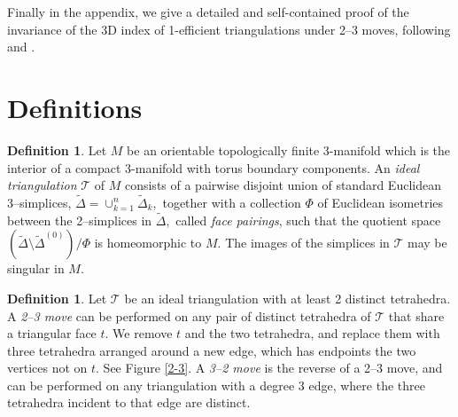 \documentclass[12pt]{amsart}
\theoremstyle{definition}
\newtheorem{defn}[thm]{Definition}
\theoremstyle{remark}
\def\tri{\mathcal{T}}
\newcommand{\CT}{\mathcal{T}}
\begin{document}
Finally in the appendix, we give a detailed and self-contained proof 
of the invariance of the 3D index of 1-efficient triangulations
under 2--3 moves, following \cite{Ga:index} and \cite{DGG2}. 


\section{Definitions}
\label{sec.definitions}

\begin{defn}
Let $M$ be an orientable topologically finite 3-manifold which is the interior of a compact 3-manifold with torus boundary components. An \emph{ideal triangulation} $\tri$ of $M$ consists of a pairwise disjoint union of standard Euclidean 3--simplices, $\widetilde{\Delta} = \cup_{k=1}^{n} \widetilde{\Delta}_k,$ together with a collection $\Phi$ of Euclidean isometries between the 2--simplices in $\widetilde{\Delta},$ called \emph{face pairings}, such that the quotient space 
$(\widetilde{\Delta} \setminus \widetilde{\Delta}^{(0)} )/ \Phi$ is homeomorphic to $M.$
The images of the simplices in $\tri$ may be singular in $M$.
\end{defn}

\begin{defn}
Let $\CT$ be an ideal triangulation with at least 2 distinct tetrahedra. A \emph{2--3 move} can be performed on any pair of distinct tetrahedra of $\CT$ that share a triangular face $t$. We remove $t$ and the two tetrahedra, and replace them with three tetrahedra arranged around a new edge, which has endpoints the two vertices not on $t$. See Figure \ref{2-3}. A \emph{3--2 move} is the reverse of a 2--3 move, and can be performed on any triangulation with a degree 3 edge, where the three tetrahedra incident to that edge are distinct.
\end{defn}
\end{document}
